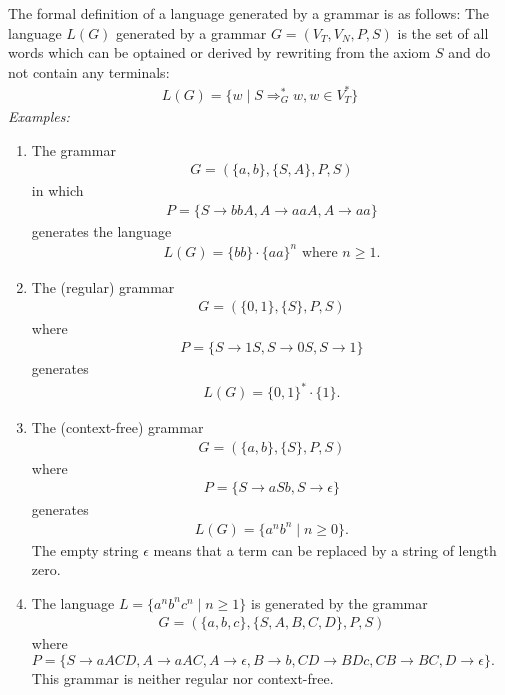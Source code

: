 The formal definition of a language generated by a grammar is as follows:
The language $L(G)$ generated by a grammar $G = (V_T, V_N, P, S)$ is the set
of all words which can be optained or derived by rewriting from the axiom $S$ 
and do not contain any terminals:
\begin{align*}
  L(G) = \{w \mid S \Rightarrow_G^{*} w, w \in V_T^{*}\}
\end{align*}
\textit{Examples:}
\begin{enumerate}
  \item The grammar
        \begin{align*}
          G = (\{a,b\}, \{S,A\}, P, S)
        \end{align*}
        in which
        \begin{align*}
          P = \{S \rightarrow bbA, A \rightarrow aaA, A \rightarrow aa\}
        \end{align*}
        generates the language
        \begin{align*}
          L(G) = \{bb\} \cdot \{aa\}^{n} \text{ where $n \geq 1$.}
        \end{align*}
  \item The (regular) grammar
        \begin{align*}
          G = (\{0,1\}, \{S\}, P, S)
        \end{align*}
        where
        \begin{align*}
          P = \{S \rightarrow 1S, S \rightarrow 0S, S \rightarrow 1\}
        \end{align*}
        generates
        \begin{align*}
          L(G) = \{0,1\}^{*} \cdot \{1\}.
        \end{align*}
  \item The (context-free) grammar
        \begin{align*}
          G = (\{a,b\}, \{S\}, P, S)
        \end{align*}
        where
        \begin{align*}
          P = \{S \rightarrow aSb, S \rightarrow \epsilon\}
        \end{align*}
        generates
        \begin{align*}
          L(G) = \{a^nb^n \mid n \geq 0\}.
        \end{align*}
        The empty string $\epsilon$ means that a term can be replaced by a string of length zero.
  \item The language $L = \{a^nb^nc^n \mid n \geq 1\}$ is generated by the grammar
        \begin{align*}
          G = (\{a,b,c\}, \{S,A,B,C,D\}, P, S)
        \end{align*}
        where
          $P = \{S \rightarrow aACD, A \rightarrow aAC, A \rightarrow \epsilon, B \rightarrow b,
          CD \rightarrow BDc, CB \rightarrow BC, D \rightarrow \epsilon
          \}.$
        This grammar is neither regular nor context-free.
\end{enumerate}
